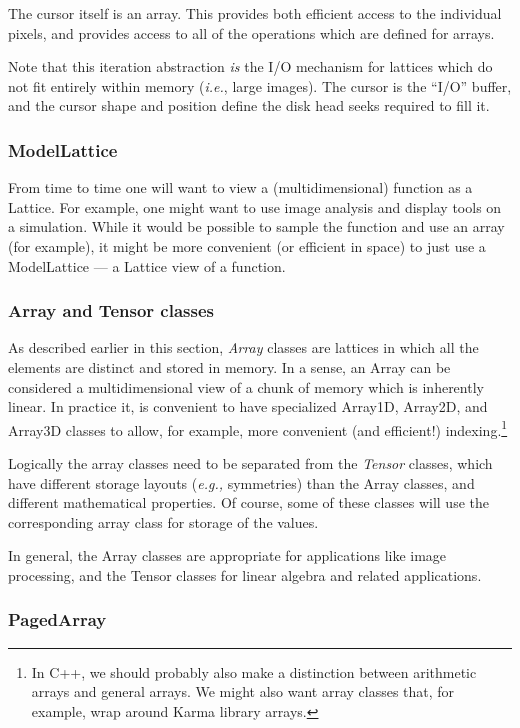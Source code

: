 The cursor itself is an array. This provides both efficient access to
the individual pixels, and provides access to all of the operations
which are defined for arrays.

Note that this iteration abstraction {\em is} the I/O mechanism for
lattices which do not fit entirely within memory ({\em i.e.}, large
images). The cursor is the ``I/O'' buffer, and the cursor shape and
position define the disk head seeks required to fill it.

\subsubsection{ModelLattice}

From time to time one will want to view a (multidimensional) function
as a Lattice. For example, one might want to use image analysis and
display tools on a simulation. While it would be possible to sample
the function and use an array (for example), it might be more
convenient (or efficient in space) to just use a ModelLattice --- a
Lattice view of a function.

\subsubsection{Array and Tensor classes}

As described earlier in this section, {\em Array} classes are lattices
in which all the elements are distinct and stored in memory. In a
sense, an Array can be considered a multidimensional view of a chunk
of memory which is inherently linear. In practice it, is convenient to
have specialized Array1D, Array2D, and Array3D classes to allow, for
example, more convenient (and efficient!) indexing.\footnote{In C++,
we should probably also make a distinction between arithmetic arrays
and general arrays. We might also want array classes that, for
example, wrap around Karma library arrays.}

Logically the array classes need to be separated from the {\em Tensor}
classes, which have different storage layouts ({\em e.g.,} symmetries)
than the Array classes, and different mathematical properties. Of
course, some of these classes will use the corresponding array class
for storage of the values.

In general, the Array classes are appropriate for applications like
image processing, and the Tensor classes for linear algebra and
related applications.

\subsubsection{PagedArray}

